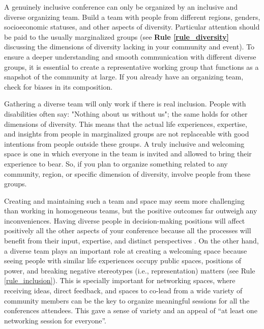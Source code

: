 \documentclass[10pt,letterpaper]{article}
\begin{document}
A genuinely inclusive conference can only be organized by an inclusive and diverse organizing team. Build a team with people from different regions, genders, socioeconomic statuses, and other aspects of diversity. Particular attention should be paid to the usually marginalized groups (see \textbf{Rule \ref{rule_diversity}} discussing the dimensions of diversity lacking in your community and event). To ensure a deeper understanding and smooth communication with different diverse groups, it is essential to create a representative working group that functions as a snapshot of the community at large. If you already have an organizing team, check for biases in its composition. 


Gathering a diverse team will only work if there is real inclusion. People with disabilities often say: "Nothing about us without us"; the same holds for other dimensions of diversity. This means that the actual life experiences, expertise, and insights from people in marginalized groups are not replaceable with good intentions from people outside these groups. A truly inclusive and welcoming space is one in which everyone in the team is invited and allowed to bring their experience to bear. So, if you plan to organize something related to any community, region, or specific dimension of diversity, involve people from these groups. 

Creating and maintaining such a team and space may seem more challenging than working in homogeneous teams, but the positive outcomes far outweigh any inconveniences. 
Having diverse people in decision-making positions will affect positively all the other aspects of your conference because all the processes will benefit from their input, expertise, and distinct perspectives \cite{hongGroupsDiverseProblem2004}. On the other hand, a diverse team plays an important role at creating a welcoming space because seeing people with similar life experiences occupy public spaces, positions of power, and breaking negative stereotypes (i.e., representation) matters (see Rule \ref{rule_inclusion}). This is specially important for networking spaces, where receiving ideas, direct feedback, and spaces to co-lead from a wide variety of community members can be the key to organize meaningful sessions for all the conferences attendees. This gave a sense of variety and an appeal of “at least one networking session for everyone”. 
\end{document}
